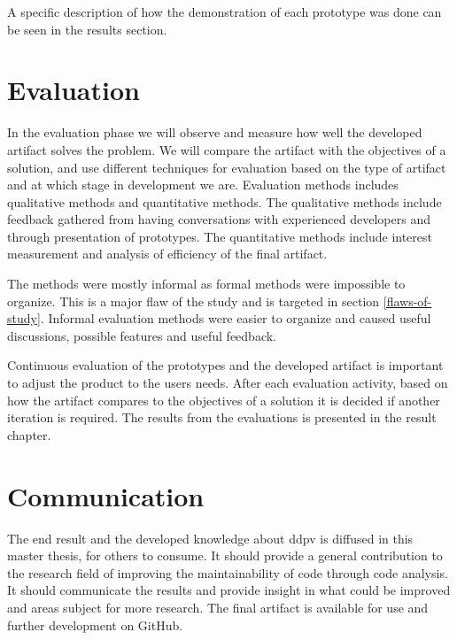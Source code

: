 \documentclass{report}
\begin{document}
A specific description of how the demonstration of each prototype was done can be seen in the results section.

 
\section{Evaluation}
In the evaluation phase we will observe and measure how well the developed artifact solves the problem. We will compare the artifact with the objectives of a solution, and use different techniques for evaluation based on the type of artifact and at which stage in development we are. Evaluation methods includes qualitative methods and quantitative methods. The qualitative methods include feedback gathered from having conversations with experienced developers and through presentation of prototypes. The quantitative methods include interest measurement and analysis of efficiency of the final artifact.   

The methods were mostly informal as formal methods were impossible to organize. This is a major flaw of the study and is targeted in section \ref{flaws-of-study}. Informal evaluation methods were easier to organize and caused useful discussions, possible features and useful feedback. 

Continuous evaluation of the prototypes and the developed artifact is important to adjust the product to the users needs. After each evaluation activity, based on how the artifact compares to the objectives of a solution it is decided if another iteration is required. The results from the evaluations is presented in the result chapter.

\section{Communication}
The end result and the developed knowledge about \gls{ddpv} is diffused in this master thesis, for others to consume. It should provide a general contribution to the research field of improving the maintainability of code through code analysis. It should communicate the results and provide insight in what could be improved and areas subject for more research. The final artifact is available for use and further development on GitHub\cite{detekt-hint-repository}.
\end{document}
